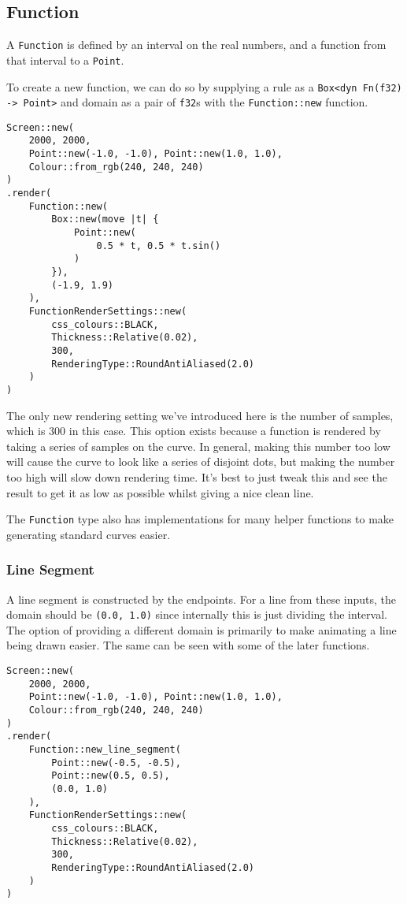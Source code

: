 \subsection{Function}

A \verb|Function| is defined by an interval on the real numbers, and a function from that interval to a \verb|Point|.

To create a new function, we can do so by supplying a rule as a \verb|Box<dyn Fn(f32) -> Point>| and domain as a pair of \verb|f32|s with the \verb|Function::new| function.

\begin{lstlisting}
Screen::new(
    2000, 2000,
    Point::new(-1.0, -1.0), Point::new(1.0, 1.0),
    Colour::from_rgb(240, 240, 240)
)
.render(
    Function::new(
        Box::new(move |t| {
            Point::new(
                0.5 * t, 0.5 * t.sin()
            )
        }),
        (-1.9, 1.9)
    ),
    FunctionRenderSettings::new(
        css_colours::BLACK,
        Thickness::Relative(0.02),
        300,
        RenderingType::RoundAntiAliased(2.0)
    )
)
\end{lstlisting}


The only new rendering setting we've introduced here is the number of samples, which is 300 in this case. This option exists because a function is rendered by taking a series of samples on the curve. In general, making this number too low will cause the curve to look like a series of disjoint dots, but making the number too high will slow down rendering time. It's best to just tweak this and see the result to get it as low as possible whilst giving a nice clean line.

The \verb|Function| type also has implementations for many helper functions to make generating standard curves easier.

\subsubsection{Line Segment}

A line segment is constructed by the endpoints. For a line from these inputs, the domain should be \verb|(0.0, 1.0)| since internally this is just dividing the interval. The option of providing a different domain is primarily to make animating a line being drawn easier. The same can be seen with some of the later functions.

\begin{lstlisting}
Screen::new(
    2000, 2000,
    Point::new(-1.0, -1.0), Point::new(1.0, 1.0),
    Colour::from_rgb(240, 240, 240)
)
.render(
    Function::new_line_segment(
        Point::new(-0.5, -0.5),
        Point::new(0.5, 0.5),
        (0.0, 1.0)
    ),
    FunctionRenderSettings::new(
        css_colours::BLACK,
        Thickness::Relative(0.02),
        300,
        RenderingType::RoundAntiAliased(2.0)
    )
)
\end{lstlisting}

